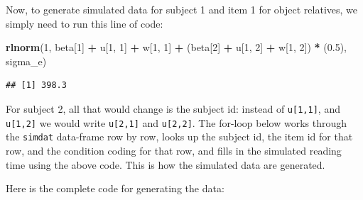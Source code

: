 \documentclass[12pt,]{krantz}
\newenvironment{Shaded}{\begin{snugshade}}{\end{snugshade}}
\newcommand{\DecValTok}[1]{\textcolor[rgb]{0.00,0.00,0.81}{#1}}
\newcommand{\FloatTok}[1]{\textcolor[rgb]{0.00,0.00,0.81}{#1}}
\newcommand{\KeywordTok}[1]{\textcolor[rgb]{0.13,0.29,0.53}{\textbf{#1}}}
\newcommand{\NormalTok}[1]{#1}
\newcommand{\OperatorTok}[1]{\textcolor[rgb]{0.81,0.36,0.00}{\textbf{#1}}}
\newcommand{\StringTok}[1]{\textcolor[rgb]{0.31,0.60,0.02}{#1}}
\begin{document}
Now, to generate simulated data for subject 1 and item 1 for object relatives, we simply need to run this line of code:

\begin{Shaded}
\begin{Highlighting}[]
\KeywordTok{rlnorm}\NormalTok{(}\DecValTok{1}\NormalTok{, beta[}\DecValTok{1}\NormalTok{] }\OperatorTok{+}\StringTok{ }\NormalTok{u[}\DecValTok{1}\NormalTok{, }\DecValTok{1}\NormalTok{] }\OperatorTok{+}\StringTok{ }\NormalTok{w[}\DecValTok{1}\NormalTok{, }\DecValTok{1}\NormalTok{] }\OperatorTok{+}\StringTok{ }\NormalTok{(beta[}\DecValTok{2}\NormalTok{] }\OperatorTok{+}\StringTok{ }
\StringTok{  }\NormalTok{u[}\DecValTok{1}\NormalTok{, }\DecValTok{2}\NormalTok{] }\OperatorTok{+}\StringTok{ }\NormalTok{w[}\DecValTok{1}\NormalTok{, }\DecValTok{2}\NormalTok{]) }\OperatorTok{*}\StringTok{ }\NormalTok{(}\FloatTok{0.5}\NormalTok{), sigma_e)}
\end{Highlighting}
\end{Shaded}

\begin{verbatim}
## [1] 398.3
\end{verbatim}

For subject 2, all that would change is the subject id: instead of \texttt{u{[}1,1{]}}, and \texttt{u{[}1,2{]}} we would write \texttt{u{[}2,1{]}} and \texttt{u{[}2,2{]}}. The for-loop below works through the \texttt{simdat} data-frame row by row, looks up the subject id, the item id for that row, and the condition coding for that row, and fills in the simulated reading time using the above code. This is how the simulated data are generated.

Here is the complete code for generating the data:
\end{document}
